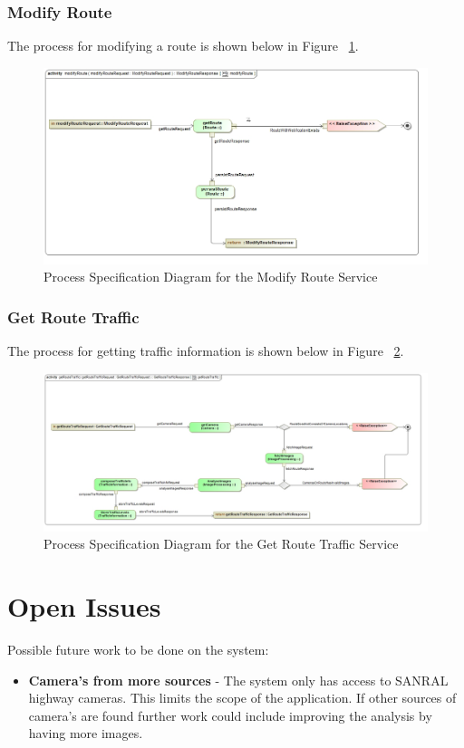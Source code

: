 \documentclass[a4paper,12pt]{article}
\begin{document}
\subsubsection{Modify Route}
The process for modifying a route is shown below in Figure ~\ref{fig:ps_modify}.
\begin{figure}[here]
\includegraphics[width=\textwidth]{images/psModify_Route.jpg} 
\caption{Process Specification Diagram for the Modify Route Service}
\label{fig:ps_modify}
\end{figure}
\subsubsection{Get Route Traffic}
The process for getting traffic information is shown below in Figure ~\ref{fig:ps_gettraffic}.
\begin{figure}[here]
\includegraphics[width=\textwidth]{images/ps_GetRouteTraffic.jpg}
\caption{Process Specification Diagram for the Get Route Traffic Service}
\label{fig:ps_gettraffic}
\end{figure}

\section{Open Issues}
Possible future work to be done on the system:
\begin{itemize}
\item \textbf{Camera's from more sources} - The system only has access to SANRAL highway cameras. This limits the scope of the application. If other sources of camera's are found further work could include improving the analysis by having more images.
\end{itemize}
\end{document}
